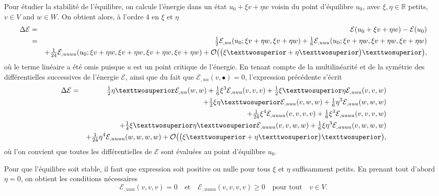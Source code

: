 \documentclass[12pt, final]{amsart}
\begin{document}
Pour étudier la stabilité de l'équilibre, on calcule l'énergie dans un état
\(u_0+\xi v+\eta w\) voisin du point d'équilibre \(u_0\), avec \(\xi , \eta \in\mathbb R \)
\guillemotleft{}petits\guillemotright{}, \(v\in V\) and \(w\in W\). On obtient alors,
à l'ordre 4 en \(\xi \) et \(\eta \)
\begin{eqnarray}
  \notag
  \Delta \mathcal E&=&\mathcal E(u_0+\xi v+\eta w)-\mathcal E(u_0)\\
  \notag
    &=&\tfrac12\mathcal E_{,uu}(u_0;\xi v+\eta w, \xi v+\eta w)
    +\tfrac16\mathcal E_{,uuu}(u_0;\xi v+\eta w, \xi v+\eta w, \xi v+\eta w)\\
    &&+\tfrac1{24}\mathcal E_{,uuuu}(u_0;\xi v+\eta w, \xi v+\eta w, \xi v+\eta w, \xi v+\eta w)
    +\mathcal{O}\bigl(\bigl(\xi ²+\eta ²\bigr)²\bigr),
\end{eqnarray}
où le terme linéaire a été omis puisque \(u\) est un point critique de
l'énergie. En tenant compte de la multilinéarité et de la symétrie des
différentielles successives de l'énergie \(\mathcal E\), ainsi que du fait que
\(\mathcal E_{,uu}(v, \bullet )=0\), l'expression précédente s'écrit
\begin{eqnarray}
  \notag
    \Delta \mathcal E&=&\tfrac12\eta ²\mathcal E_{,uu}(w, w)+\tfrac16\xi ^3\mathcal E_{,uuu}(v, v, v)
          +\tfrac12\xi ²\eta \mathcal E_{,uuu}(v, v, w)\\
  \notag
      &&+\tfrac12\xi \eta ²\mathcal E_{,uuu}(v, w, w)+\tfrac16\eta ^3\mathcal E_{,uuu}(w, w, w)\\
  \notag
      &&+\tfrac1{24}\xi ^4\mathcal E_{,uuuu}(v, v, v, v)+\tfrac16\xi ^3\mathcal E_{,uuuu}(v, v, v, w)\\
  \notag
      &&+\tfrac14\xi ²\eta ²\mathcal E_{,uuuu}(v, v, w, w)+\tfrac16\xi \eta ^3\mathcal E_{,uuuu}(v, w, w, w)\\
    &&+\tfrac1{24}\eta ^4\mathcal E_{,uuuu}(w, w, w, w)+\mathcal{O}\bigl(\bigl(\xi ²+\eta ²\bigr)²\bigr),
\end{eqnarray}
où l'on convient que toutes les différentielles de \(\mathcal E\) sont évaluées au point
d'équilibre \(u_0\).

Pour que l'équilibre soit stable, il faut que expression soit positive ou nulle
pour tous \(\xi \) et \(\eta \) suffisamment petits. En prenant tout d'abord \(\eta =0\),
on obtient les conditions nécessaires
\begin{equation}
  \label{eq20211108164416}
  \mathcal E_{,uuu}(v, v, v)=0\quad\text{et}\quad\mathcal E_{,uuuu}(v, v, v, v)\geq0
  \quad\text{pour tout}\quad v\in V.
\end{equation}
\end{document}
